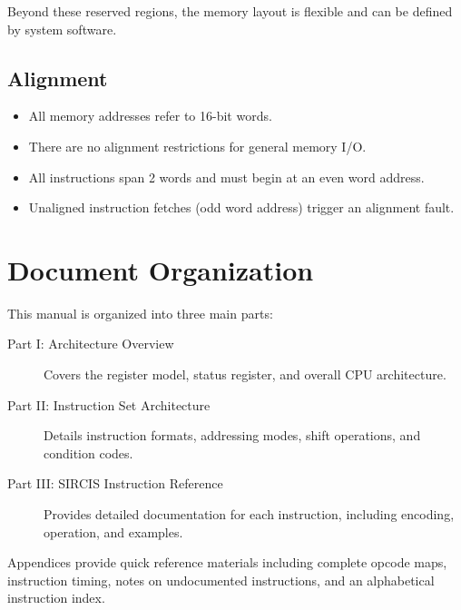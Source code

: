 Beyond these reserved regions, the memory layout is flexible and can be defined by system software.

\subsection{Alignment}

\begin{itemize}
	\item All memory addresses refer to 16-bit words.
	\item There are no alignment restrictions for general memory I/O.
	\item All instructions span 2 words and must begin at an even word address.
	\item Unaligned instruction fetches (odd word address) trigger an alignment fault.
\end{itemize}

\section{Document Organization}

This manual is organized into three main parts:

\begin{description}
	\item[Part I: Architecture Overview] Covers the register model, status register, and overall CPU architecture.

	\item[Part II: Instruction Set Architecture] Details instruction formats, addressing modes, shift operations, and condition
	      codes.

	\item[Part III: SIRCIS Instruction Reference] Provides detailed documentation for each instruction, including encoding,
	      operation, and examples.
\end{description}

Appendices provide quick reference materials including complete opcode maps, instruction timing, notes on undocumented
instructions, and an alphabetical instruction index.
